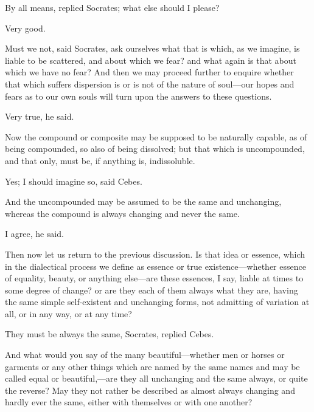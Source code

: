 \documentclass[11pt,letter]{article}
\begin{document}
\par  By all means, replied Socrates; what else should I please?

\par  Very good.

\par  Must we not, said Socrates, ask ourselves what that is which, as we imagine, is liable to be scattered, and about which we fear? and what again is that about which we have no fear? And then we may proceed further to enquire whether that which suffers dispersion is or is not of the nature of soul—our hopes and fears as to our own souls will turn upon the answers to these questions.

\par  Very true, he said.

\par  Now the compound or composite may be supposed to be naturally capable, as of being compounded, so also of being dissolved; but that which is uncompounded, and that only, must be, if anything is, indissoluble.

\par  Yes; I should imagine so, said Cebes.

\par  And the uncompounded may be assumed to be the same and unchanging, whereas the compound is always changing and never the same.

\par  I agree, he said.

\par  Then now let us return to the previous discussion. Is that idea or essence, which in the dialectical process we define as essence or true existence—whether essence of equality, beauty, or anything else—are these essences, I say, liable at times to some degree of change? or are they each of them always what they are, having the same simple self-existent and unchanging forms, not admitting of variation at all, or in any way, or at any time?

\par  They must be always the same, Socrates, replied Cebes.

\par  And what would you say of the many beautiful—whether men or horses or garments or any other things which are named by the same names and may be called equal or beautiful,—are they all unchanging and the same always, or quite the reverse? May they not rather be described as almost always changing and hardly ever the same, either with themselves or with one another?
\end{document}
